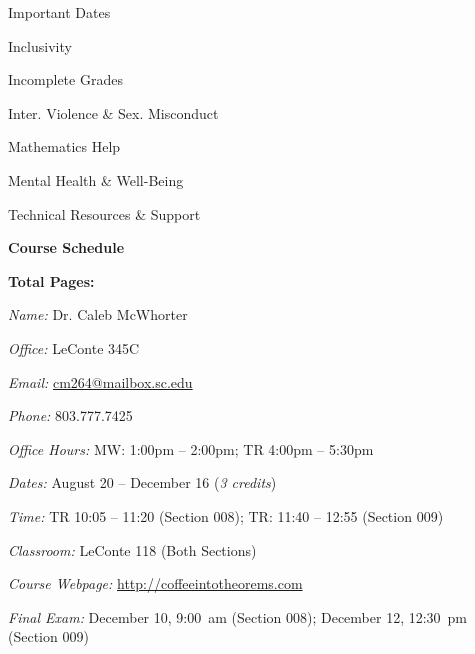 \documentclass[11pt,letterpaper]{article}
\makeatletter
\newcommand{\classdates}{August 20 -- December 16 (\textit{3 credits})}
\newcommand{\classtimes}{TR 10:05 -- 11:20 (Section 008); TR: 11:40 -- 12:55 (Section 009)}
\newcommand{\classroom}{LeConte 118 (Both Sections)}
\newcommand{\instructor}{Dr. Caleb McWhorter}
\newcommand{\office}{LeConte 345C}
\newcommand{\phone}{803.777.7425}
\newcommand{\email}{cm264@mailbox.sc.edu}
\newcommand{\website}{http://coffeeintotheorems.com}
\newcommand{\officehours}{MW: 1:00pm -- 2:00pm; TR 4:00pm -- 5:30pm}
\makeatother
\begin{document}
\begin{minipage}[t]{0.45\textwidth}
\hspace{0.3cm} Important Dates \dotfill \pageref{univ_dates} \par
\hspace{0.3cm} Inclusivity \dotfill \pageref{univ_inclusion} \par
\hspace{0.3cm} Incomplete Grades \dotfill \pageref{univ_incomplete} \par
\hspace{0.3cm} Inter. Violence \& Sex. Misconduct \dotfill \pageref{univ_viosexmis} \par
\hspace{0.3cm} Mathematics Help \dotfill \pageref{univ_mathhelp} \par
\hspace{0.3cm} Mental Health \& Well-Being \dotfill \pageref{univ_mental} \par
\hspace{0.3cm} Technical Resources \& Support \dotfill \pageref{univ_techsupport} \par
{\bfseries\color{scred} Course Schedule} \dotfill \pageref{schd} \par
\hfill {\bfseries\color{scred} Total Pages:} \pageref*{LastPage}
\end{minipage}
\par\vspace{0.2cm}






\vspace{-0.1cm}  \vspace{-0.4cm}

\textit{Name:} \instructor \par
\textit{Office:} \office \par
\textit{Email:} \href{mailto:\email}{\email} \par
\textit{Phone:} \phone \par
\textit{Office Hours:} \officehours 
\pvspace{0.2cm}



\textit{Dates:} \classdates \par
\textit{Time:} \classtimes \par
\textit{Classroom:} \classroom \par
\textit{Course Webpage:} \href{\website}{\website} \par
\textit{Final Exam:} December 10, 9:00~am (Section 008); December 12, 12:30~pm (Section 009)
\sectionbreak
\end{document}
